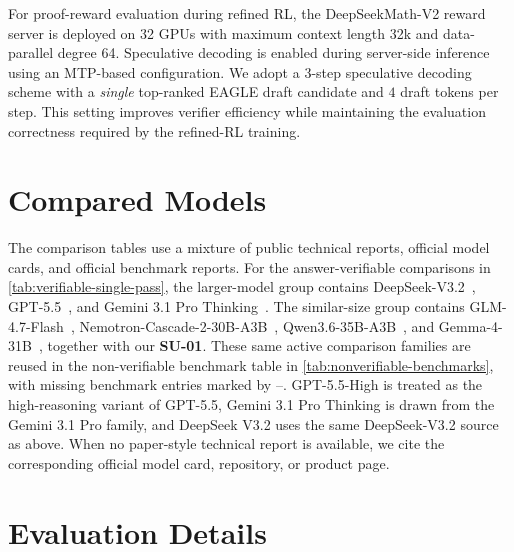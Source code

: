 \documentclass{llmxive}
\begin{document}
For proof-reward evaluation during refined RL, the DeepSeekMath-V2 reward server is deployed on 32 GPUs with maximum context length 32k and data-parallel degree 64. 
Speculative decoding is enabled during server-side inference using an MTP-based configuration. We adopt a $3$-step speculative decoding scheme with a \textit{single} top-ranked EAGLE draft candidate and $4$ draft tokens per step. This setting improves verifier efficiency while maintaining the evaluation correctness required by the refined-RL training.


\section{Compared Models}
\label{app:compared-models}

The comparison tables use a mixture of public technical reports, official model
cards, and official benchmark reports. For the answer-verifiable comparisons in
\cref{tab:verifiable-single-pass}, the larger-model group contains
DeepSeek-V3.2~\citep{deepseekai2025deepseekv32}, GPT-5.5~\citep{openai2026gpt55},
and Gemini 3.1 Pro Thinking~\citep{googledeepmind2026gemini31pro}. The
similar-size group contains GLM-4.7-Flash~\citep{zai2026glm47flash},
Nemotron-Cascade-2-30B-A3B~\citep{yang2026nemotroncascade2},
Qwen3.6-35B-A3B~\citep{qwen2026qwen36_35b}, and
Gemma-4-31B~\citep{google2026gemma4_31b}, together with our
\textbf{SU-01}. These same active comparison families are reused in the
non-verifiable benchmark table in \cref{tab:nonverifiable-benchmarks}, with
missing benchmark entries marked by --. GPT-5.5-High is treated as the
high-reasoning variant of GPT-5.5, Gemini 3.1 Pro Thinking is drawn from the
Gemini 3.1 Pro family, and DeepSeek V3.2 uses the same DeepSeek-V3.2 source as
above. When no paper-style technical report is available, we cite the
corresponding official model card, repository, or product page.

\section{Evaluation Details}
\label{app:evaluation-details}
\end{document}
